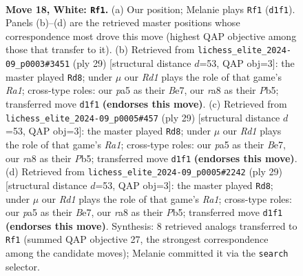 \documentclass[11pt]{article}
\begin{document}
\clearpage

\begin{figure}[p]\centering
\begin{subfigure}{0.46\textwidth}\centering
\resizebox{\linewidth}{!}{%
\newchessgame
\chessboard[
  setfen={rnb3r1/1p3ppp/1k2pn2/pNb5/P6P/1B2P3/1P1B1PP1/RN1R2K1 w - - 13 18},
  showmover=false,
  pgfstyle=straightmove, color=movearrow, markmove={d1-f1}
]}
\caption{}
\end{subfigure}\hfill
\begin{subfigure}{0.46\textwidth}\centering
\resizebox{\linewidth}{!}{%
\newchessgame
\chessboard[
  setfen={r3k2r/2p1bppp/p3b3/1pn1P3/8/5N2/PPB2PPP/R1BR2K1 b kq - 0 15},
  showmover=false,
  pgfstyle=straightmove, color=movearrow, markmove={a8-d8}
]}
\caption{}
\end{subfigure}
\\[4pt]
\begin{subfigure}{0.46\textwidth}\centering
\resizebox{\linewidth}{!}{%
\newchessgame
\chessboard[
  setfen={r3k2r/2p1bppp/p3b3/1pn1P3/8/5N2/PPB2PPP/R1BR2K1 b kq - 0 15},
  showmover=false,
  pgfstyle=straightmove, color=movearrow, markmove={a8-d8}
]}
\caption{}
\end{subfigure}\hfill
\begin{subfigure}{0.46\textwidth}\centering
\resizebox{\linewidth}{!}{%
\newchessgame
\chessboard[
  setfen={r3k2r/2p1bppp/p3b3/1pn1P3/8/5N2/PPB2PPP/R1BR2K1 b kq - 0 15},
  showmover=false,
  pgfstyle=straightmove, color=movearrow, markmove={a8-d8}
]}
\caption{}
\end{subfigure}
\caption{\textbf{Move 18, White: \texttt{Rf1}.} (a) Our position; Melanie plays \texttt{Rf1} (\texttt{d1f1}). Panels (b)--(d) are the retrieved master positions whose correspondence most drove this move (highest QAP objective among those that transfer to it). (b) Retrieved from \texttt{lichess\_elite\_2024-09\_p0003\#3451} (ply 29) [structural distance $d$=53, QAP obj=3]: the master played \texttt{Rd8}; under $\mu$ our \emph{Rd1} plays the role of that game's \emph{Ra1}; cross-type roles: our \emph{p}a5 as their \emph{B}e7, our \emph{r}a8 as their \emph{P}b5; transferred move \texttt{d1f1} \textbf{(endorses this move)}. (c) Retrieved from \texttt{lichess\_elite\_2024-09\_p0005\#457} (ply 29) [structural distance $d$=53, QAP obj=3]: the master played \texttt{Rd8}; under $\mu$ our \emph{Rd1} plays the role of that game's \emph{Ra1}; cross-type roles: our \emph{p}a5 as their \emph{B}e7, our \emph{r}a8 as their \emph{P}b5; transferred move \texttt{d1f1} \textbf{(endorses this move)}. (d) Retrieved from \texttt{lichess\_elite\_2024-09\_p0005\#2242} (ply 29) [structural distance $d$=53, QAP obj=3]: the master played \texttt{Rd8}; under $\mu$ our \emph{Rd1} plays the role of that game's \emph{Ra1}; cross-type roles: our \emph{p}a5 as their \emph{B}e7, our \emph{r}a8 as their \emph{P}b5; transferred move \texttt{d1f1} \textbf{(endorses this move)}. Synthesis: 8 retrieved analogs transferred to \texttt{Rf1} (summed QAP objective 27, the strongest correspondence among the candidate moves); Melanie committed it via the \texttt{search} selector.}
\label{fig:thought-m34}
\end{figure}
\end{document}
